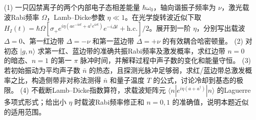 (1) 一只囚禁离子的两个内部电子态相差能量 \(\hbar\omega_0\)，轴向谐振子频率为 \(\nu\)，激光载波Rabi频率 \(\Omega\)，Lamb–Dicke参数 \(\eta\ll1\)。在光学旋转波近似下取
\(H_I(t)=\hbar\Omega[\sigma_+e^{i\eta(ae^{-i\nu t}+a^\dagger e^{i\nu t})}e^{-i\Delta t}+\mathrm{h.c.}]/2\)。展开到一阶 \(\eta\)，分别写出载波 \(\Delta=0\)、第一红边带 \(\Delta=-\nu\) 和第一蓝边带 \(\Delta=+\nu\) 的有效耦合哈密顿量。
(2) 对初态 \(|g,n\rangle\) 求第一红、蓝边带的准确共振Rabi频率及激发概率，求红边带 \(n=0\) 的暗态、\(n=1\) 的第一 \(\pi\) 脉冲时间，并解释过程中声子数的变化和能量守恒。
(3) 若初始振动为平均声子数 \(\bar n\) 的热态，且探测光脉冲足够弱，求红/蓝边带总激发概率之比，构造侧带非对称法测得 \(\bar n\) 和量子温度 \(T\) 的公式，讨论冷却到基态的极限。
(4) 不截断Lamb–Dicke指数算符，求载波矩阵元 \(\langle n|e^{i\eta(a+a^\dagger)}|n\rangle\) 的Laguerre多项式形式；给出小 \(\eta\) 时载波Rabi频率修正和 \(n=0,1\) 的准确值，说明本题近似的适用范围。

